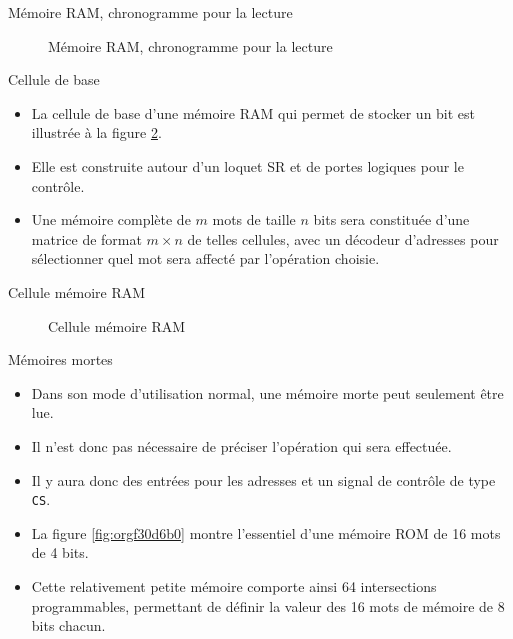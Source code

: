 \documentclass[presentation]{beamer}
\begin{document}
\begin{frame}[label={sec:orgd3a757e}]{Mémoire RAM, chronogramme pour la lecture}
\begin{figure}[htbp]
\centering

\caption{\label{fig:org0a2be70}Mémoire RAM, chronogramme pour la lecture}
\end{figure}
\end{frame}

\begin{frame}[label={sec:orgc39f6c4}]{Cellule de base}
\begin{itemize}
\item La cellule de base d'une mémoire RAM qui permet de stocker un bit est illustrée à la figure \ref{fig:orgf3540f4}.

\item Elle est construite autour d'un loquet SR et de portes logiques pour le contrôle.

\item Une mémoire complète de \(m\) mots de taille \(n\) bits sera constituée d'une matrice de format \(m \times n\) de telles cellules, avec un décodeur d'adresses pour sélectionner quel mot sera affecté par l'opération choisie.
\end{itemize}
\end{frame}

\begin{frame}[label={sec:org28e8cc4}]{Cellule mémoire RAM}
\begin{figure}[htbp]
\centering

\caption{\label{fig:orgf3540f4}Cellule mémoire RAM}
\end{figure}
\end{frame}


\begin{frame}[label={sec:org8962976},fragile]{Mémoires mortes}
 \begin{itemize}
\item Dans son mode d'utilisation normal, une mémoire morte peut seulement être lue.

\item Il n'est donc pas nécessaire de préciser l'opération qui sera effectuée.

\item Il y aura donc des entrées pour les adresses et un signal de contrôle de type \texttt{CS}.

\item La figure \ref{fig:orgf30d6b0} montre l'essentiel d'une mémoire ROM de 16 mots de 4 bits.

\item Cette relativement petite mémoire comporte ainsi 64 intersections programmables, permettant de définir la valeur des 16 mots de mémoire de 8 bits chacun.
\end{itemize}
\end{frame}
\end{document}

